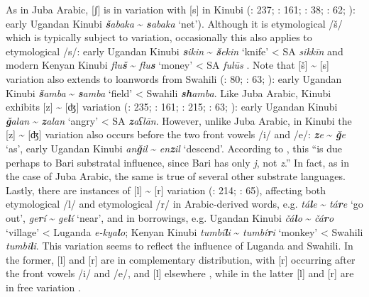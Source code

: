 \documentclass[output=paper]{langsci/langscibook}
\begin{document}
  As in Juba Arabic, [ʃ] is in variation with [s] in Kinubi (\citealt{Owens1985}: 237; \citealt{Owens1997}: 161; \citealt{Wellens2003}: 38; \citealt{Luffin2005}: 62; \citealt{Avram2017talk}): early Ugandan Kinubi \textit{\textbf{š}abaka} {\textasciitilde} \textit{\textbf{s}abaka} ‘net’). Although it is etymological /š/ which is typically subject to variation, occasionally this also applies to etymological /s/: early Ugandan Kinubi \textit{\textbf{s}ikin} {\textasciitilde} \textit{\textbf{š}ekin} ‘knife’ < SA \textit{sikkīn} \citep{Avram2017talk} and modern Kenyan Kinubi \textit{flu\textbf{š}} {\textasciitilde} \textit{flu\textbf{s}} ‘money’ < SA \textit{fulūs} \citep[63]{Luffin2005}. Note that [š] {\textasciitilde} [s] variation also extends to loanwords from Swahili (\citealt{Wellens2003}: 80; \citealt{Luffin2005}: 63; \citealt{Avram2017talk}): early Ugandan Kinubi \textit{\textbf{š}amba} {\textasciitilde} \textit{\textbf{s}amba} ‘field’ < Swahili \textit{\textbf{sh}amba}. Like Juba Arabic, Kinubi exhibits [z] {\textasciitilde} [ʤ] variation (\citealt{Owens1985}: 235; \citealt{Owens1997}: 161; \citealt{Wellens2003}: 215; \citealt{Luffin2005}: 63; \citealt{Avram2017talk}): early Ugandan Kinubi \textit{\textbf{ǧ}alan} {\textasciitilde} \textit{\textbf{z}alan} ‘angry’ < SA \textit{\textbf{z}aʕlān}. However, unlike Juba Arabic, in Kinubi the [z] {\textasciitilde} [ʤ] variation also occurs before the two front vowels /i/ and /e/: \textit{\textbf{z}e} {\textasciitilde} \textit{\textbf{ǧ}e} ‘as’, early Ugandan Kinubi \textit{an\textbf{ǧ}il} {\textasciitilde} \textit{en\textbf{z}il} ‘descend’. According to \citet[161]{Owens1997}, this “is due perhaps to Bari substratal influence, since Bari has only \textit{j}, not \textit{z}.” In fact, as in the case of Juba Arabic, the same is true of several other substrate languages. Lastly, there are instances of [l] {\textasciitilde} [r] variation (\citealt{Wellens2003}: 214; \citealt{Luffin2005}: 65), affecting both etymological /l/ and etymological /r/ in Arabic-derived words, e.g. \textit{tá\textbf{l}e} {\textasciitilde} \textit{tá\textbf{r}e} ‘go out’, \textit{ge\textbf{r}í} {\textasciitilde} \textit{ge\textbf{l}í} ‘near’, and in borrowings, e.g. Ugandan Kinubi \textit{čá\textbf{l}o} {\textasciitilde} \textit{čá\textbf{r}o} ‘village’ < Luganda \textit{e-kya\textbf{l}o}; Kenyan Kinubi \textit{tumbí\textbf{l}i} {\textasciitilde} \textit{tumbí\textbf{r}i} ‘monkey’ < Swahili \textit{tumbi\textbf{l}i}. This variation seems to reflect the influence of \mbox{Luganda} and Swahili. In the former, [l] and [r] are in complementary distribution, with [r] occurring after the front vowels /i/ and /e/, and [l] elsewhere \citep[214]{Wellens2003}, while in the latter [l] and [r] are in free variation \citep[79]{Luffin2014}. 
\end{document}

